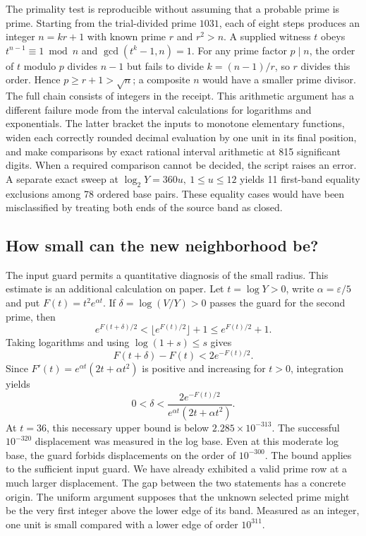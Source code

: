 \documentclass[12pt,letterpaper]{article}
\begin{document}
The primality test is reproducible without assuming that a probable prime is prime. Starting from the trial-divided prime \(1031\), each of eight steps produces an integer \(n=kr+1\) with known prime \(r\) and \(r^2>n\). A supplied witness \(t\) obeys \(t^{n-1}\equiv1\bmod n\) and \(\gcd(t^k-1,n)=1\). For any prime factor \(p\mid n\), the order of \(t\) modulo \(p\) divides \(n-1\) but fails to divide \(k=(n-1)/r\), so \(r\) divides this order. Hence \(p\ge r+1>\sqrt n\); a composite \(n\) would have a smaller prime divisor. The full chain consists of integers in the receipt. This arithmetic argument has a different failure mode from the interval calculations for logarithms and exponentials. The latter bracket the inputs to monotone elementary functions, widen each correctly rounded decimal evaluation by one unit in its final position, and make comparisons by exact rational interval arithmetic at 815 significant digits. When a required comparison cannot be decided, the script raises an error. A separate exact sweep at \(\log_2Y=360u,\ 1\le u\le12\) yields 11 first-band equality exclusions among 78 ordered base pairs. These equality cases would have been misclassified by treating both ends of the source band as closed.

\subsection{How small can the new neighborhood be?}

The input guard permits a quantitative diagnosis of the small radius. This estimate is an additional calculation on paper. Let \(t=\log Y>0\), write \(\alpha=\varepsilon/5\) and put \(F(t)=t^2e^{\alpha t}\). If \(\delta=\log(V/Y)>0\) passes the guard for the second prime, then
\[
 e^{F(t+\delta)/2}<\lfloor e^{F(t)/2}\rfloor+1
 \le e^{F(t)/2}+1 .
\]
Taking logarithms and using \(\log(1+s)\le s\) gives
\[
 F(t+\delta)-F(t)<2e^{-F(t)/2}.
\]
Since \(F'(t)=e^{\alpha t}(2t+\alpha t^2)\) is positive and increasing for \(t>0\), integration yields
\[
 0<\delta<\frac{2 e^{-F(t)/2}}{e^{\alpha t}(2t+\alpha t^2)}.
\]
At \(t=36\), this necessary upper bound is below \(2.285\times10^{-313}\). The successful \(10^{-320}\) displacement was measured in the log base. Even at this moderate log base, the guard forbids displacements on the order of \(10^{-300}\). The bound applies to the sufficient input guard. We have already exhibited a valid prime row at a much larger displacement. The gap between the two statements has a concrete origin. The uniform argument supposes that the unknown selected prime might be the very first integer above the lower edge of its band. Measured as an integer, one unit is small compared with a lower edge of order \(10^{311}\).
\end{document}
